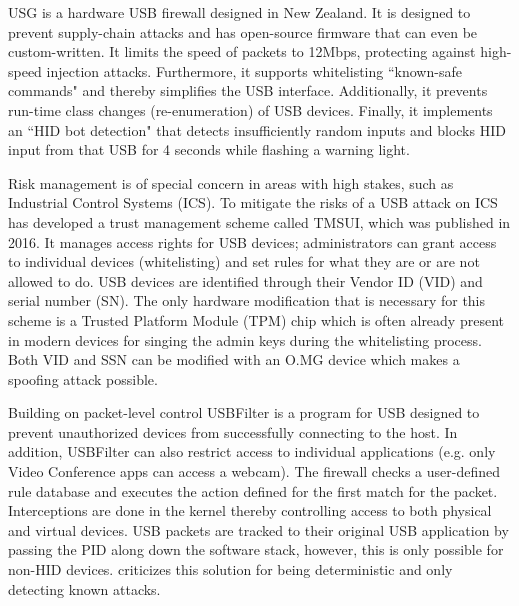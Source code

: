 USG \cite{robertfiskRobertfiskUSG2016} is a hardware USB firewall designed in New Zealand. It is designed to prevent supply-chain attacks and has open-source firmware that can even be custom-written. It limits the speed of packets to 12Mbps, protecting against high-speed injection attacks. Furthermore, it supports whitelisting ``known-safe commands" and thereby simplifies the USB interface. Additionally, it prevents run-time class changes (re-enumeration) of USB devices. Finally, it implements an ``HID bot detection" that detects insufficiently random inputs and blocks HID input from that USB for 4 seconds while flashing a warning light. 

Risk management is of special concern in areas with high stakes, such as Industrial Control Systems (ICS). To mitigate the risks of a USB attack on ICS \cite{yangTMSUITrustManagement2016} has developed a trust management scheme called TMSUI, which was published in 2016. It manages access rights for USB devices; administrators can grant access to individual devices (whitelisting) and set rules for what they are or are not allowed to do. USB devices are identified through their Vendor ID (VID) and serial number (SN). The only hardware modification that is necessary for this scheme is a Trusted Platform Module (TPM) chip which is often already present in modern devices for singing the admin keys during the whitelisting process. \\
Both VID and SSN can be modified with an O.MG device which makes a spoofing attack possible.

Building on packet-level control USBFilter \cite{tianMakingUSBGreat2016} is a program for USB designed to prevent unauthorized devices from successfully connecting to the host. In addition, USBFilter can also restrict access to individual applications (e.g. only Video Conference apps can access a webcam). The firewall checks a user-defined rule database and executes the action defined for the first match for the packet. Interceptions are done in the kernel thereby controlling access to both physical and virtual devices. USB packets are tracked to their original USB application by passing the PID along down the software stack, however, this is only possible for non-HID devices.
\cite{nissimUSBbasedAttacks2017} criticizes this solution for being deterministic and only detecting known attacks. 

